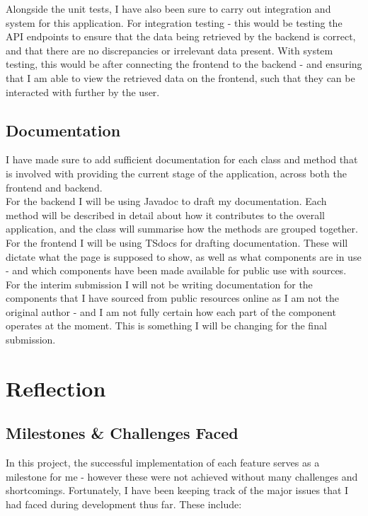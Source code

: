 \documentclass[]{final_report}
\begin{document}
Alongside the unit tests, I have also been sure to carry out integration and system for this application. For integration testing - this would be testing the API endpoints to ensure that the data being retrieved by the backend is correct, and that there are no discrepancies or irrelevant data present. With system testing, this would be after connecting the frontend to the backend - and ensuring that I am able to view the retrieved data on the frontend, such that they can be interacted with further by the user.

\section{Documentation}

I have made sure to add sufficient documentation for each class and method that is involved with providing the current stage of the application, across both the frontend and backend.\\

For the backend I will be using Javadoc to draft my documentation. Each method will be described in detail about how it contributes to the overall application, and the class will summarise how the methods are grouped together. For the frontend I will be using TSdocs for drafting documentation. These will dictate what the page is supposed to show, as well as what components are in use - and which components have been made available for public use with sources. \\

For the interim submission I will not be writing documentation for the components that I have sourced from public resources online as I am not the original author - and I am not fully certain how each part of the component operates at the moment. This is something I will be changing for the final submission.

\chapter{Reflection}
\section{Milestones \& Challenges Faced}

In this project, the successful implementation of each feature serves as a milestone for me - however these were not achieved without many challenges and shortcomings. Fortunately, I have been keeping track of the major issues that I had faced during development thus far. These include:
\end{document}
